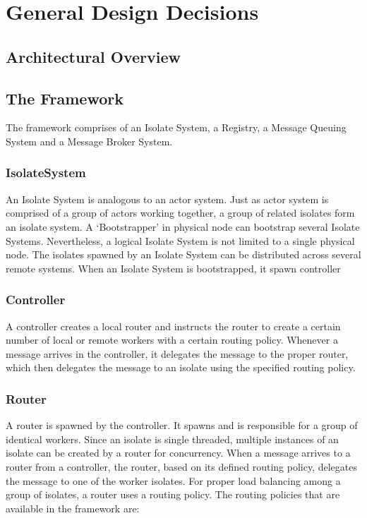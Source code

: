 \chapter{General Design Decisions}\label{chapter:general_design_decisions}

\section{Architectural Overview}

\section{The Framework}
The framework comprises of an Isolate System, a Registry, a Message Queuing System and a Message Broker System.
  \subsection{IsolateSystem}
  An Isolate System is analogous to an actor system. Just as actor system is comprised of a group of actors working together, a group of related isolates form an isolate system. A ‘Bootstrapper’ in physical node can bootstrap several Isolate Systems. Nevertheless, a logical Isolate System is not limited to a single physical node. The isolates spawned by an Isolate System can be distributed across several remote systems.
  When an Isolate System is bootstrapped, it spawn controller

  \subsection{Controller}
  A controller creates a local router and instructs the router to create a certain number of local or remote workers with a certain routing policy. Whenever a message arrives in the controller, it delegates the message to the proper router, which then delegates the message to an isolate using the specified routing policy.
  \subsection{Router}
  A router is spawned by the controller. It spawns and is responsible for a group of identical workers. Since an isolate is single threaded, multiple instances of an isolate can be created by a router for concurrency. When a message arrives to a router from a controller, the router, based on its defined routing policy, delegates the message to one of the worker isolates.
  For proper load balancing among a group of isolates, a router uses a routing policy. The routing policies that are available in the framework are:


